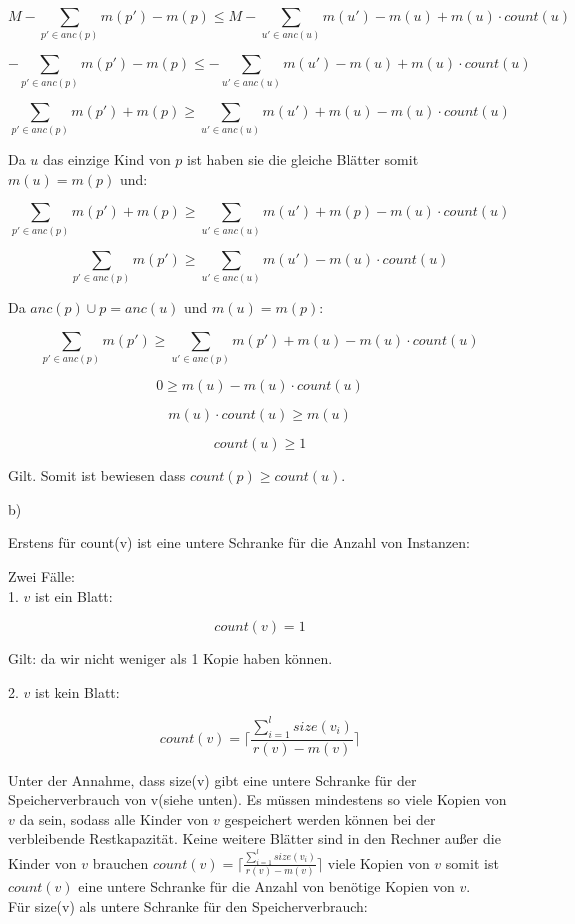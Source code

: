 \documentclass[a4paper,12pt]{scrartcl}
\begin{document}
$$ M - \sum_{p' \in anc(p)}m(p') - m(p)\leq M - \sum_{u' \in anc(u)}m(u') - m(u) + m(u)\cdot count(u)$$

$$ - \sum_{p' \in anc(p)}m(p') - m(p)\leq - \sum_{u' \in anc(u)}m(u') - m(u) + m(u)\cdot count(u)$$

$$ \sum_{p' \in anc(p)}m(p') + m(p)\geq \sum_{u' \in anc(u)}m(u') + m(u) - m(u)\cdot count(u)$$

Da $u$ das einzige Kind von $p$ ist haben sie die gleiche Blätter somit $m(u) = m(p)$ und:

$$ \sum_{p' \in anc(p)}m(p') + m(p)\geq \sum_{u' \in anc(u)}m(u') + m(p) - m(u)\cdot count(u)$$

$$ \sum_{p' \in anc(p)}m(p')\geq \sum_{u' \in anc(u)}m(u') - m(u)\cdot count(u)$$

Da $anc(p)\cup {p} = anc(u)$ und $m(u) = m(p)$:


$$ \sum_{p' \in anc(p)}m(p')\geq \sum_{u' \in anc(p)}m(p') + m(u) - m(u)\cdot count(u)$$

$$ 0 \geq m(u) - m(u)\cdot count(u)$$

$$ m(u)\cdot count(u)\geq m(u)$$

$$ count(u)\geq 1$$

Gilt. Somit ist bewiesen dass  $count(p) \geq count(u).$    

b)

Erstens für count(v) ist eine untere Schranke für die Anzahl von Instanzen:

Zwei Fälle:\\


1. $v$ ist ein Blatt:

$$count(v) = 1$$

Gilt: da wir nicht weniger als 1 Kopie haben können.

2. $v$ ist kein Blatt:

$$count(v) = \lceil {\frac{\sum_{i=1}^{l} size(v_i)}{r(v) - m(v)}}\rceil $$

Unter der Annahme, dass size(v) gibt eine untere Schranke für der Speicherverbrauch von v(siehe unten). Es müssen mindestens so viele Kopien von $v$ da sein, sodass alle Kinder von $v$ gespeichert werden können bei der verbleibende Restkapazität. Keine weitere Blätter sind in den Rechner außer die Kinder von $v$ brauchen  $count(v) = \lceil {\frac{\sum_{i=1}^{l} size(v_i)}{r(v) - m(v)}}\rceil $ viele Kopien von $v$ somit ist $count(v)$ eine untere Schranke für die Anzahl von benötige Kopien von $v$. \\

Für size(v) als untere Schranke für den Speicherverbrauch:
\end{document}
